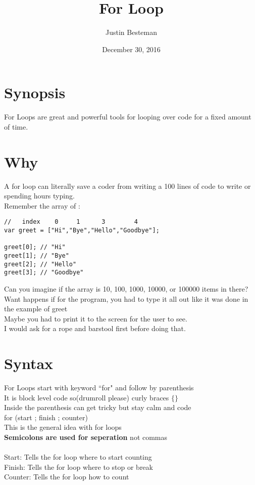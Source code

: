 \documentclass[12pt, letterpaper]{article}
\title{For Loop }
\author{Justin Besteman}
\date{December 30, 2016}
\begin{document}
\maketitle


\section*{Synopsis}

For Loops are great and powerful tools for looping over code for a fixed amount of time.\\

\section*{Why}

A for loop can literally save a coder from writing a 100 lines of code to write or spending hours typing. \\
Remember the array of :

\begin{lstlisting}
//   index    0     1      3        4
var greet = ["Hi","Bye","Hello","Goodbye"];

greet[0]; // "Hi"
greet[1]; // "Bye"
greet[2]; // "Hello"
greet[3]; // "Goodbye"
\end{lstlisting}
Can you imagine if the array is 10, 100, 1000, 10000, or 100000 items in there?
Want happens if for the program, you had to type it all out like it was done in the example of greet \\
Maybe you had to print it to the screen for the user to see. \\
I would ask for a rope and barstool first before doing that.\\
\section*{Syntax}

For Loops start with keyword ``for" and follow by parenthesis\\
It is block level code so(drumroll please) curly braces $\lbrace\rbrace$ \\
Inside the parenthesis can get tricky but stay calm and code\\
for (start ; finish ; counter) \\
This is the general idea with for loops \\
\textbf{Semicolons are used for seperation} not commas\\
\\
Start: Tells the for loop where to start counting\\
Finish: Tells the for loop where to stop or break\\
Counter: Tells the for loop how to count\\
\end{document}
